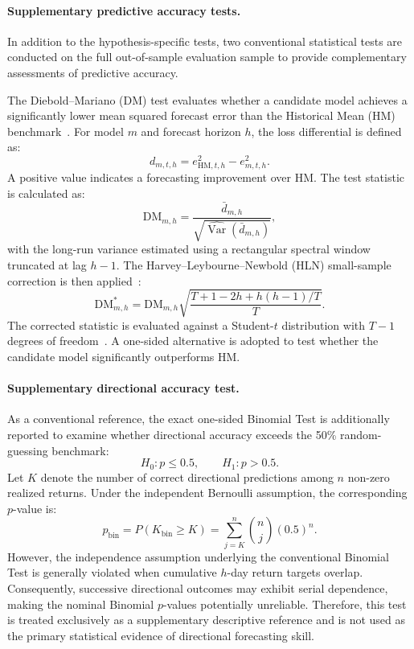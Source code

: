 \documentclass[runningheads,orivec]{llncs}
\begin{document}
\paragraph{Supplementary predictive accuracy tests.} In addition to the hypothesis-specific tests, two conventional statistical tests are conducted on the full out-of-sample evaluation sample to provide complementary assessments of predictive accuracy.

The Diebold--Mariano (DM) test evaluates whether a candidate model achieves a significantly lower mean squared forecast error than the Historical Mean (HM) benchmark~\cite{diebold1995}. For model $m$ and forecast horizon $h$, the loss differential is defined as:
\[
d_{m,t,h}
=
e^2_{\mathrm{HM},t,h}-e^2_{m,t,h}.
\]
A positive value indicates a forecasting improvement over HM. The test statistic is calculated as:
\[
\mathrm{DM}_{m,h}
=
\frac{\bar d_{m,h}}
{\sqrt{\widehat{\operatorname{Var}}(\bar d_{m,h})}},
\]
with the long-run variance estimated using a rectangular spectral window truncated at lag $h-1$. The Harvey--Leybourne--Newbold (HLN) small-sample correction is then applied~\cite{buturac2022,diebold1995,harvey1997}:
\begin{equation}\label{eq:dm_stat}
\mathrm{DM}^{*}_{m,h}
=
\mathrm{DM}_{m,h}
\sqrt{
\frac{T+1-2h+h(h-1)/T}{T}
}.
\end{equation}
The corrected statistic is evaluated against a Student-$t$ distribution with $T-1$ degrees of freedom~\cite{buturac2022,harvey1997}. A one-sided alternative is adopted to test whether the candidate model significantly outperforms HM.

\paragraph{Supplementary directional accuracy test.} As a conventional reference, the exact one-sided Binomial Test is additionally reported to examine whether directional accuracy exceeds the 50\% random-guessing benchmark:
\[
H_0:p\leq 0.5,
\qquad
H_1:p>0.5.
\]
Let $K$ denote the number of correct directional predictions among $n$ non-zero realized returns. Under the independent Bernoulli assumption, the corresponding $p$-value is:
\[
p_{\mathrm{bin}}
=
P(K_{\mathrm{bin}}\geq K)
=
\sum_{j=K}^{n}
\binom{n}{j}(0.5)^n.
\]
However, the independence assumption underlying the conventional Binomial Test is generally violated when cumulative $h$-day return targets overlap. Consequently, successive directional outcomes may exhibit serial dependence, making the nominal Binomial $p$-values potentially unreliable. Therefore, this test is treated exclusively as a supplementary descriptive reference and is not used as the primary statistical evidence of directional forecasting skill.
\end{document}
